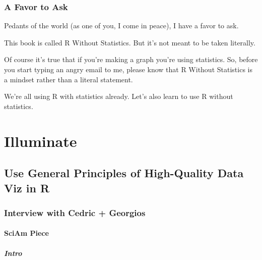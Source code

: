 \documentclass[
]{book}
\begin{document}
\hypertarget{a-favor-to-ask}{%
\section*{A Favor to Ask}\label{a-favor-to-ask}}

Pedants of the world (as one of you, I come in peace), I have a favor to ask.

This book is called R Without Statistics. But it's not meant to be taken literally.

Of course it's true that if you're making a graph you're using statistics. So, before you start typing an angry email to me, please know that R Without Statistics is a mindset rather than a literal statement.

We're all using R with statistics already. Let's also learn to use R without statistics.

\hypertarget{part-illuminate}{%
\part*{Illuminate}\label{part-illuminate}}

\hypertarget{use-general-principles-of-high-quality-data-viz-in-r}{%
\chapter*{Use General Principles of High-Quality Data Viz in R}\label{use-general-principles-of-high-quality-data-viz-in-r}}

\hypertarget{interview-with-cedric-georgios}{%
\section*{Interview with Cedric + Georgios}\label{interview-with-cedric-georgios}}

\hypertarget{sciam-piece}{%
\subsection*{SciAm Piece}\label{sciam-piece}}

\hypertarget{intro}{%
\subsubsection*{Intro}\label{intro}}
\end{document}
